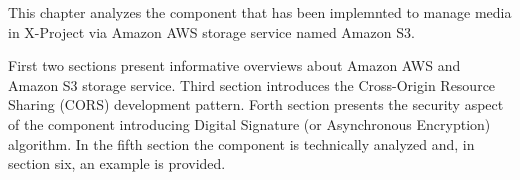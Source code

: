 This chapter analyzes the component that has been implemnted to manage media in X-Project via Amazon AWS storage service named Amazon S3.

First two sections present informative overviews about Amazon AWS and Amazon S3 storage service. Third section introduces the Cross-Origin Resource Sharing (CORS) development pattern. Forth section presents the security aspect of the component introducing Digital Signature (or Asynchronous Encryption) algorithm. In the fifth section the component is technically analyzed and, in section six, an example is provided.